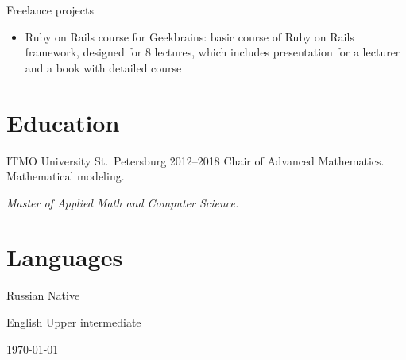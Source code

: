\documentclass{cv}
\begin{document}
\begin{cvblock}{Freelance projects}
	\begin{itemize}
		\item Ruby on Rails course for Geekbrains:
		      basic course of Ruby on Rails framework, designed for 8 lectures, which
		      includes presentation for a lecturer and a book with detailed course
	\end{itemize}
\end{cvblock}

\section{Education}

\begin{cvblock}{%
		\blocktitle
		{ITMO University}
		{St.~Petersburg}
		{}
		{2012--2018}}
	Chair of Advanced Mathematics. Mathematical modeling.
	\vspace{1em}

	\textit{Master of Applied Math and Computer Science.}
\end{cvblock}

\section{Languages}

\begin{cvblock}{Russian}
	Native
\end{cvblock}

\begin{cvblock}{English}
	Upper intermediate
\end{cvblock}

\vfill
\begin{center}
	\monthyear\today
\end{center}
\end{document}
